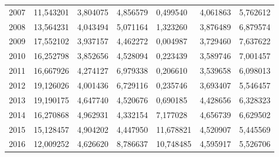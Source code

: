 \begin{table}
\begin{tabular}{p{1cm}p{2cm}p{2cm}p{2cm}p{2cm}p{2cm}p{2cm}}
 2007 &                                   11,543201 &                                   3,804075 &                                           4,856579 &                               0,499540 &                4,061863 &                                     5,762612 \\
 2008 &                                   13,564231 &                                   4,043494 &                                           5,071164 &                               1,323260 &                3,876489 &                                     6,879574 \\
 2009 &                                   17,552102 &                                   3,937157 &                                           4,462272 &                               0,004987 &                3,729460 &                                     7,637622 \\
 2010 &                                   16,252798 &                                   3,852656 &                                           4,528094 &                               0,223439 &                3,589746 &                                     7,001457 \\
 2011 &                                   16,667926 &                                   4,274127 &                                           6,979338 &                               0,206610 &                3,539658 &                                     6,098013 \\
 2012 &                                   19,126026 &                                   4,001436 &                                           6,729116 &                               0,235746 &                3,693407 &                                     5,546457 \\
 2013 &                                   19,190175 &                                   4,647740 &                                           4,520676 &                               0,690185 &                4,428656 &                                     6,328323 \\
 2014 &                                   16,270868 &                                   4,962931 &                                           4,332154 &                               7,177028 &                4,656739 &                                     6,629502 \\
 2015 &                                   15,128457 &                                   4,904202 &                                           4,447950 &                              11,678821 &                4,520907 &                                     5,445569 \\
 2016 &                                   12,009252 &                                   4,626620 &                                           8,786637 &                              10,748485 &                4,595917 &                                     5,526706 \\
\bottomrule
\end{tabular}
\end{table}
